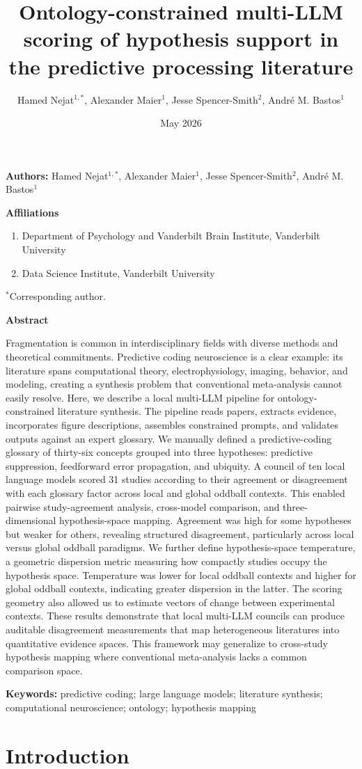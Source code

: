 \documentclass[12pt]{article}
\title{Ontology-constrained multi-LLM scoring of hypothesis support in the predictive processing literature}
\author{Hamed Nejat$^{1,*}$, Alexander Maier$^{1}$, Jesse Spencer-Smith$^{2}$, Andr\'e M. Bastos$^{1}$}
\date{May 2026}
\makeatletter
\renewcommand{\maketitle}{%
  \begin{flushleft}
  {\large\bfseries \@title\par}
  \vspace{0.9em}
  {\normalsize\textbf{Authors:} Hamed Nejat$^{1,*}$, Alexander Maier$^{1}$, Jesse Spencer-Smith$^{2}$, Andr\'e M. Bastos$^{1}$\par}
  \vspace{0.9em}
  {\normalsize\bfseries Affiliations\par}
  \vspace{0.5em}
  \begin{enumerate}[leftmargin=0.75in,label=\arabic*.]
  \item Department of Psychology and Vanderbilt Brain Institute, Vanderbilt University
  \item Data Science Institute, Vanderbilt University
  \end{enumerate}
  \vspace{0.3em}
  {\normalsize $^*$Corresponding author.\par}
  \end{flushleft}
  \vspace{0.4em}
}
\makeatother
\begin{document}
\pagestyle{plain}
\maketitle

\noindent\textbf{Abstract}\par
Fragmentation is common in interdisciplinary fields with diverse methods and theoretical commitments. Predictive coding neuroscience is a clear example: its literature spans computational theory, electrophysiology, imaging, behavior, and modeling, creating a synthesis problem that conventional meta-analysis cannot easily resolve. Here, we describe a local multi-LLM pipeline for ontology-constrained literature synthesis. The pipeline reads papers, extracts evidence, incorporates figure descriptions, assembles constrained prompts, and validates outputs against an expert glossary. We manually defined a predictive-coding glossary of thirty-six concepts grouped into three hypotheses: predictive suppression, feedforward error propagation, and ubiquity. A council of ten local language models scored 31 studies according to their agreement or disagreement with each glossary factor across local and global oddball contexts. This enabled pairwise study-agreement analysis, cross-model comparison, and three-dimensional hypothesis-space mapping. Agreement was high for some hypotheses but weaker for others, revealing structured disagreement, particularly across local versus global oddball paradigms. We further define hypothesis-space temperature, a geometric dispersion metric measuring how compactly studies occupy the hypothesis space. Temperature was lower for local oddball contexts and higher for global oddball contexts, indicating greater dispersion in the latter. The scoring geometry also allowed us to estimate vectors of change between experimental contexts. These results demonstrate that local multi-LLM councils can produce auditable disagreement measurements that map heterogeneous literatures into quantitative evidence spaces. This framework may generalize to cross-study hypothesis mapping where conventional meta-analysis lacks a common comparison space.

\vspace{0.8em}
\noindent\textbf{Keywords:} predictive coding; large language models; literature synthesis; computational neuroscience; ontology; hypothesis mapping

\section{Introduction}\label{introduction}
\end{document}
